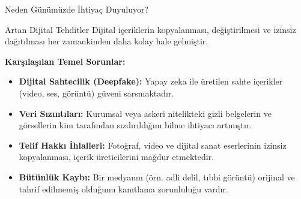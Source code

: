 \documentclass[aspectratio=169,xcolor={dvipsnames}]{beamer}
\begin{document}
\begin{frame}{Neden Günümüzde İhtiyaç Duyuluyor?}
\begin{alertblock}{Artan Dijital Tehditler}
Dijital içeriklerin kopyalanması, değiştirilmesi ve izinsiz dağıtılması her zamankinden daha kolay hale gelmiştir.
\end{alertblock}

\textbf{Karşılaşılan Temel Sorunlar:}
\begin{itemize}
\item \textbf{Dijital Sahtecilik (Deepfake):} Yapay zeka ile üretilen sahte içerikler (video, ses, görüntü) güveni sarsmaktadır.
\item \textbf{Veri Sızıntıları:} Kurumsal veya askeri nitelikteki gizli belgelerin ve görsellerin kim tarafından sızdırıldığını bilme ihtiyacı artmıştır.
\item \textbf{Telif Hakkı İhlalleri:} Fotoğraf, video ve dijital sanat eserlerinin izinsiz kopyalanması, içerik üreticilerini mağdur etmektedir.
\item \textbf{Bütünlük Kaybı:} Bir medyanın (örn. adli delil, tıbbi görüntü) orijinal ve tahrif edilmemiş olduğunu kanıtlama zorunluluğu vardır.
\end{itemize}
\end{frame}
\end{document}
